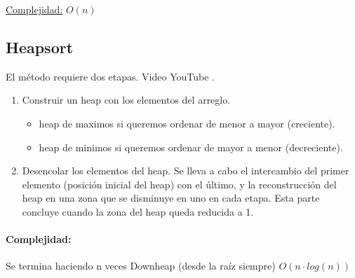 \documentclass[../main.tex]{subfiles}
\begin{document}
            \underline{Complejidad:} $O(n)$
        
        \subsection{Heapsort}
            El método requiere dos etapas. Video YouTube \cite{Heapsort_youtube}.
            \begin{enumerate}
                \item Construir un heap con los elementos del arreglo.
                    \begin{itemize}
                        \item heap de maximos si queremos ordenar de menor a mayor (creciente).
                        \item heap de minimos si queremos ordenar de mayor a menor (decreciente).
                    \end{itemize}
                \item Desencolar los elementos del heap. Se lleva a cabo el intercambio del primer elemento (posición inicial del heap) con el último, y la reconstrucción del heap en una zona que se disminuye en uno en cada etapa. Esta parte concluye cuando la zona del heap queda reducida a 1.
            \end{enumerate}

            \paragraph{Complejidad:} Se termina haciendo n veces Downheap (desde la raíz siempre) $O(n \cdot log(n))$
\end{document}
